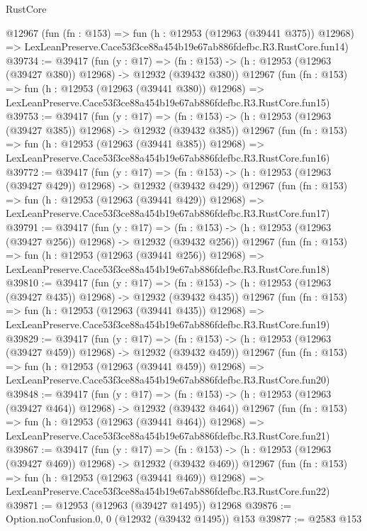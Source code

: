 \begin{lexlean}{RustCore}
\begin{coremodule}
    @12967
    (fun (fn : @153) =>
    fun (h : @12953 (@12963 (@39441 @375)) @12968) =>
    LexLeanPreserve.Cace53f3ce88a454b19e67ab886fdefbc.R3.RustCore.fun14)
@39734 := @39417
    (fun (y : @17) =>
    (fn : @153) -> (h : @12953 (@12963 (@39427 @380)) @12968) -> @12932 (@39432 @380))
    @12967
    (fun (fn : @153) =>
    fun (h : @12953 (@12963 (@39441 @380)) @12968) =>
    LexLeanPreserve.Cace53f3ce88a454b19e67ab886fdefbc.R3.RustCore.fun15)
@39753 := @39417
    (fun (y : @17) =>
    (fn : @153) -> (h : @12953 (@12963 (@39427 @385)) @12968) -> @12932 (@39432 @385))
    @12967
    (fun (fn : @153) =>
    fun (h : @12953 (@12963 (@39441 @385)) @12968) =>
    LexLeanPreserve.Cace53f3ce88a454b19e67ab886fdefbc.R3.RustCore.fun16)
@39772 := @39417
    (fun (y : @17) =>
    (fn : @153) -> (h : @12953 (@12963 (@39427 @429)) @12968) -> @12932 (@39432 @429))
    @12967
    (fun (fn : @153) =>
    fun (h : @12953 (@12963 (@39441 @429)) @12968) =>
    LexLeanPreserve.Cace53f3ce88a454b19e67ab886fdefbc.R3.RustCore.fun17)
@39791 := @39417
    (fun (y : @17) =>
    (fn : @153) -> (h : @12953 (@12963 (@39427 @256)) @12968) -> @12932 (@39432 @256))
    @12967
    (fun (fn : @153) =>
    fun (h : @12953 (@12963 (@39441 @256)) @12968) =>
    LexLeanPreserve.Cace53f3ce88a454b19e67ab886fdefbc.R3.RustCore.fun18)
@39810 := @39417
    (fun (y : @17) =>
    (fn : @153) -> (h : @12953 (@12963 (@39427 @435)) @12968) -> @12932 (@39432 @435))
    @12967
    (fun (fn : @153) =>
    fun (h : @12953 (@12963 (@39441 @435)) @12968) =>
    LexLeanPreserve.Cace53f3ce88a454b19e67ab886fdefbc.R3.RustCore.fun19)
@39829 := @39417
    (fun (y : @17) =>
    (fn : @153) -> (h : @12953 (@12963 (@39427 @459)) @12968) -> @12932 (@39432 @459))
    @12967
    (fun (fn : @153) =>
    fun (h : @12953 (@12963 (@39441 @459)) @12968) =>
    LexLeanPreserve.Cace53f3ce88a454b19e67ab886fdefbc.R3.RustCore.fun20)
@39848 := @39417
    (fun (y : @17) =>
    (fn : @153) -> (h : @12953 (@12963 (@39427 @464)) @12968) -> @12932 (@39432 @464))
    @12967
    (fun (fn : @153) =>
    fun (h : @12953 (@12963 (@39441 @464)) @12968) =>
    LexLeanPreserve.Cace53f3ce88a454b19e67ab886fdefbc.R3.RustCore.fun21)
@39867 := @39417
    (fun (y : @17) =>
    (fn : @153) -> (h : @12953 (@12963 (@39427 @469)) @12968) -> @12932 (@39432 @469))
    @12967
    (fun (fn : @153) =>
    fun (h : @12953 (@12963 (@39441 @469)) @12968) =>
    LexLeanPreserve.Cace53f3ce88a454b19e67ab886fdefbc.R3.RustCore.fun22)
@39871 := @12953 (@12963 (@39427 @1495)) @12968
@39876 := Option.noConfusion.{0, 0} (@12932 (@39432 @1495)) @153
@39877 := @2583 @153

\end{coremodule}
\end{lexlean}
